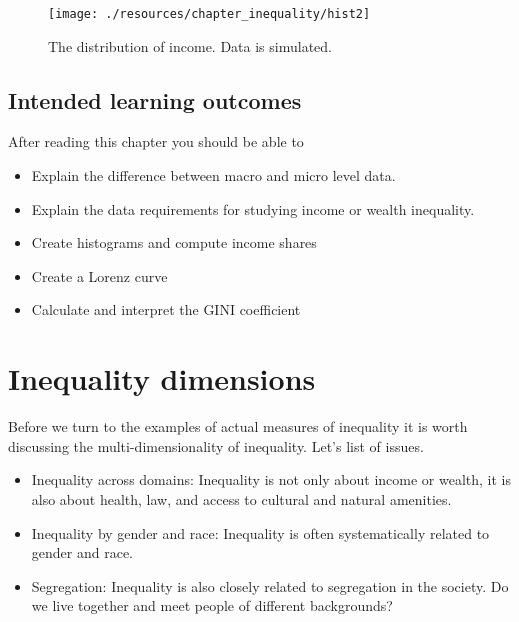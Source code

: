 \documentclass[
]{book}
\providecommand{\tightlist}{%
  \setlength{\itemsep}{0pt}\setlength{\parskip}{0pt}}
\begin{document}
\begin{figure}

{\centering \texttt{[image: ./resources/chapter\_inequality/hist2]} 

}

\caption{The distribution of income. Data is simulated.}\label{fig:in0}
\end{figure}

\hypertarget{intended-learning-outcomes-2}{%
\subsection{Intended learning outcomes}\label{intended-learning-outcomes-2}}

After reading this chapter you should be able to

\begin{itemize}
\tightlist
\item
  Explain the difference between macro and micro level data.
\item
  Explain the data requirements for studying income or wealth inequality.
\item
  Create histograms and compute income shares
\item
  Create a Lorenz curve
\item
  Calculate and interpret the GINI coefficient
\end{itemize}

\hypertarget{inequality-dimensions}{%
\section{Inequality dimensions}\label{inequality-dimensions}}

Before we turn to the examples of actual measures of inequality it is worth discussing the multi-dimensionality of inequality. Let's list of issues.

\begin{itemize}
\item
  Inequality across domains: Inequality is not only about income or wealth, it is also about health, law, and access to cultural and natural amenities.
\item
  Inequality by gender and race: Inequality is often systematically related to gender and race.
\item
  Segregation: Inequality is also closely related to segregation in the society. Do we live together and meet people of different backgrounds?
\end{itemize}
\end{document}
